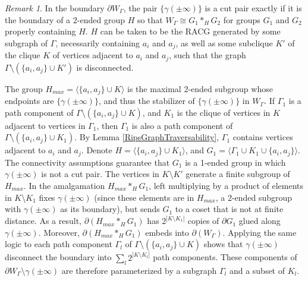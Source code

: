 \documentclass[10pt,a4paper]{amsart}
\theoremstyle{definition}
\theoremstyle{remark}
\newtheorem{remark}[theorem]{Remark}
\begin{document}
    \begin{remark}
		
		In the boundary $\partial W_\Gamma$, the pair $\{\gamma(\pm\infty)\}$ is a cut pair exactly if it is the boundary of a 2-ended group $H$ so that $W_\Gamma \cong G_1*_HG_2$ for groups $G_1$ and $G_2$ properly containing $H$. $H$ can be taken to be the RACG generated by some subgraph of $\Gamma$, necessarily containing $a_i$ and $a_j$, as well as some subclique $K'$ of the clique $K$ of vertices adjacent to $a_i$ and $a_j$, such that the graph $\Gamma\setminus( \{a_i, a_j\}\cup K')$ is disconnected.
		
		The group $H_{max}=\langle \{a_i, a_j\}\cup K\rangle$ is the maximal 2-ended subgroup whose endpoints are $\{\gamma(\pm\infty)\}$, and thus the stabilizer of $\{\gamma(\pm\infty)\}$ in $W_\Gamma$. If $\Gamma_1$ is a path component of \newline $\Gamma\setminus (\{a_i, a_j\}\cup K)$, and $K_1$ is the clique of vertices in $K$ adjacent to vertices in $\Gamma_1$, then $\Gamma_1$ is also a path component of $\Gamma\setminus (\{a_i, a_j\}\cup K_1)$. By Lemma \ref{RipsGraphTraversability}, $\Gamma_1$ contains vertices adjacent to $a_i$ and $a_j$.  Denote $H=\langle \{a_i, a_j\}\cup K_1\rangle$, and $G_1=\langle \Gamma_1\cup K_1 \cup \{a_i, a_j\}\rangle$. The connectivity assumptions guarantee that $G_1$ is a 1-ended group in which $\gamma(\pm \infty)$ is not a cut pair. The vertices in $K\setminus K'$ generate a finite subgroup of $H_{max}$. In the amalgamation $H_{max}*_H G_1$, left multiplying by a product of elements in $K\setminus K_1$ fixes $\gamma(\pm\infty)$ (since these elements are in $H_{max}$, a 2-ended subgroup with $\gamma(\pm\infty)$ as its boundary), but sends $G_1$ to a coset that is not at finite distance. As a result, $\partial(H_{max}*_H G_1)$ has $2^{|K\setminus K_1|}$ copies of $\partial G_1$ glued along $\gamma(\pm\infty)$. Moreover, $\partial(H_{max}*_H G_1)$ embeds into $\partial(W_\Gamma)$. Applying the same logic to each path component $\Gamma_l$ of $\Gamma\setminus (\{a_i, a_j\}\cup K)$ shows that $\gamma(\pm\infty)$ disconnect the boundary into $\sum _l 2^{|K\setminus K_l|}$ path components. These components of $\partial W_\Gamma\setminus \gamma(\pm\infty)$ are therefore parameterized by a subgraph $\Gamma_l$ and a subset of $K_l$.	
    \end{remark}
\end{document}
